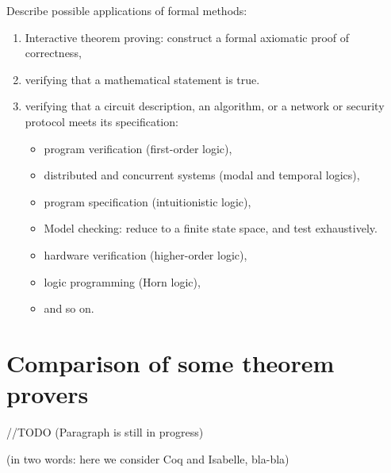 \documentclass[article]{aaltoseries}
\begin{document}
Describe possible applications of formal methods:
\begin{enumerate}
	\itemsep0em
	\item Interactive theorem proving: construct a formal axiomatic proof of correctness, 
	\item verifying that a mathematical statement is true.
	\item verifying that a circuit description, an algorithm, or a network or security protocol meets its specification:
	\begin{itemize}
		\item program verification (first-order logic), 
		\item distributed and concurrent systems (modal and temporal logics), 
		\item program specification (intuitionistic logic),
		\item Model checking: reduce to a finite state space, and test exhaustively.
		\item hardware verification (higher-order logic), 
		\item logic programming (Horn logic), 
		\item and so on.
	\end{itemize}
\end{enumerate}


\section{Comparison of some theorem provers}
\label{sec:comparison}

//TODO (Paragraph is still in progress) 

(in two words: here we consider Coq and Isabelle, bla-bla)


\end{document}
